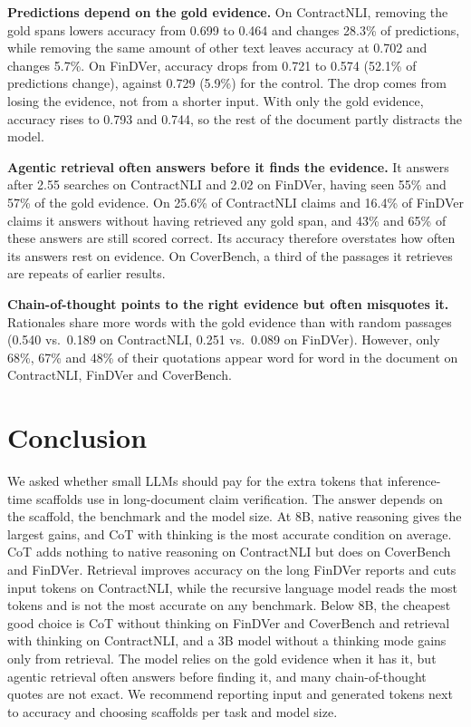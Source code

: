 \documentclass[11pt]{article}
\begin{document}
\noindent \textbf{Predictions depend on the gold evidence.} On ContractNLI,
removing the gold spans lowers accuracy from 0.699 to 0.464 and changes
28.3\% of predictions, while removing the same amount of other text leaves
accuracy at 0.702 and changes 5.7\%. On FinDVer, accuracy drops from 0.721
to 0.574 (52.1\% of predictions change), against 0.729 (5.9\%) for the
control. The drop comes from losing the evidence, not from a shorter
input. With only the gold evidence, accuracy rises to 0.793 and 0.744, so
the rest of the document partly distracts the model.

\noindent \textbf{Agentic retrieval often answers before it finds the
evidence.} It answers after 2.55 searches on ContractNLI and 2.02 on
FinDVer, having seen 55\% and 57\% of the gold evidence. On 25.6\% of
ContractNLI claims and 16.4\% of FinDVer claims it answers without having
retrieved any gold span, and 43\% and 65\% of these answers are still
scored correct. Its accuracy therefore overstates how often its answers
rest on evidence. On CoverBench, a third of the passages it retrieves are
repeats of earlier results.

\noindent \textbf{Chain-of-thought points to the right evidence but often
misquotes it.} Rationales share more words with the gold evidence than
with random passages (0.540 vs.\ 0.189 on ContractNLI, 0.251 vs.\ 0.089 on
FinDVer). However, only 68\%, 67\% and 48\% of their quotations appear word
for word in the document on ContractNLI, FinDVer and CoverBench.

\section{Conclusion}
\label{sec:conclusion}

We asked whether small LLMs should pay for the extra tokens that
inference-time scaffolds use in long-document claim verification. The
answer depends on the scaffold, the benchmark and the model size. At 8B,
native reasoning gives the largest gains, and CoT with thinking is the
most accurate condition on average. CoT adds nothing to native reasoning
on ContractNLI but does on CoverBench and FinDVer. Retrieval improves
accuracy on the long FinDVer reports and cuts input tokens on ContractNLI,
while the recursive language model reads the most tokens and is not the
most accurate on any benchmark. Below 8B, the cheapest good choice is CoT
without thinking on FinDVer and CoverBench and retrieval with thinking on
ContractNLI, and a 3B model without a thinking mode gains only from
retrieval. The model relies on the gold evidence when it has it, but
agentic retrieval often answers before finding it, and many
chain-of-thought quotes are not exact. We recommend reporting input and
generated tokens next to accuracy and choosing scaffolds per task and
model size.
\end{document}
